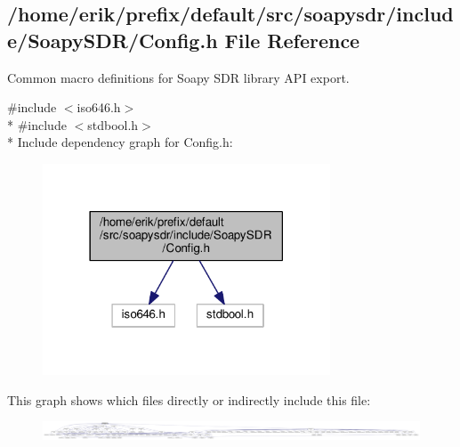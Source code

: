 \subsection{/home/erik/prefix/default/src/soapysdr/include/\+Soapy\+S\+D\+R/\+Config.h File Reference}
\label{Config_8h}


Common macro definitions for Soapy S\+DR library A\+PI export.  


{\ttfamily \#include $<$iso646.\+h$>$}\\*
{\ttfamily \#include $<$stdbool.\+h$>$}\\*
Include dependency graph for Config.\+h\+:
\nopagebreak
\begin{figure}[H]
\begin{center}
\leavevmode
\includegraphics[width=242pt]{d2/d2b/Config_8h__incl}
\end{center}
\end{figure}
This graph shows which files directly or indirectly include this file\+:
\nopagebreak
\begin{figure}[H]
\begin{center}
\leavevmode
\includegraphics[width=350pt]{de/d00/Config_8h__dep__incl}
\end{center}
\end{figure}
